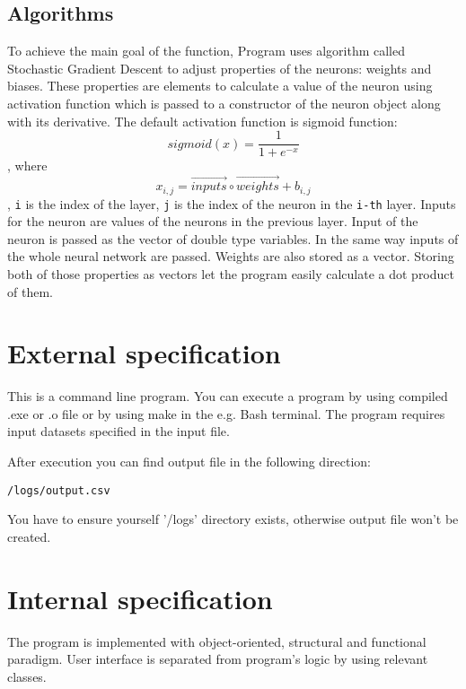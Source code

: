 \documentclass[12pt,a4paper,twoside]{article}
\begin{document}
\subsection{Algorithms}
To achieve the main goal of the function, Program uses algorithm called Stochastic Gradient Descent to adjust properties of the neurons: weights and biases. These properties are elements to calculate a value of the neuron using activation function which is passed to a constructor of the neuron object along with its derivative. The default activation function is sigmoid function: $$ sigmoid(x) = \frac{\mathrm{1} }{\mathrm{1} + e^{-x} }  $$, where $$ x_{i,j} =  \overrightarrow{inputs}  \circ  \overrightarrow{weights} +  b_{i,j} $$, \texttt{i} is the index of the layer, \texttt{j} is the index of the neuron in the \texttt{i-th} layer. Inputs for the neuron are values of the neurons in the previous layer. Input of the neuron is passed as the vector of double type variables. In the same way inputs of the whole neural network are passed. Weights are also stored as a vector. Storing both of those properties as vectors let the program easily calculate a dot product of them.


\section{External specification}
\label{sec:external}
This is a command line program.%
You can execute a program by using compiled .exe or .o file or by using make in the e.g. Bash terminal.
The program requires input datasets specified in the input file.

After execution you can find output file in the following direction:
\begin{verbatim}
/logs/output.csv
\end{verbatim}

You have to ensure yourself '/logs' directory exists, otherwise output file won't be created.


\section{Internal specification}\label{sec:internal}
The program is implemented with object-oriented, structural and functional paradigm. User interface is separated from program's logic by using relevant classes.
\end{document}
